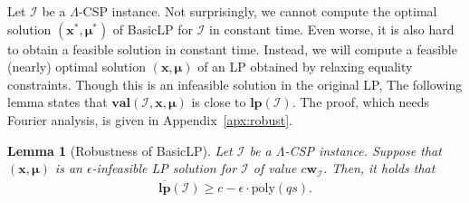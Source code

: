 \documentclass[letterpaper, 11pt]{article}
\newtheorem{lemma}[theorem]{Lemma}
\newcommand{\calI}{\mathcal{I}}
\newcommand{\biw}{\boldsymbol{w}}
\newcommand{\bix}{\boldsymbol{x}}
\newcommand{\bimu}{\boldsymbol{\mu}}
\newcommand{\blp}{\textsf{BasicLP}\xspace}
\newcommand{\lp}{\mathbf{lp}}
\newcommand{\val}{\mathbf{val}}
\newcommand{\ollp}{\overline{\mathbf{lp}}}
\newcommand{\poly}{\mathrm{poly}}
\begin{document}
Let $\calI$ be a $\Lambda$-CSP instance.
Not surprisingly,
we cannot compute the optimal solution $(\bix^*,\bimu^*)$ of \blp for $\calI$ in constant time.
Even worse, it is also hard to obtain a feasible solution in constant time.
Instead, we will compute a feasible (nearly) optimal solution $(\bix,\bimu)$ of an LP obtained by relaxing equality constraints.
Though this is an infeasible solution in the original LP,
The following lemma states that $\val(\calI,\bix,\bimu)$ is close to $\lp(\calI)$.
The proof, which needs Fourier analysis, is given in Appendix~\ref{apx:robust}.
\begin{lemma}[Robustness of \blp]\label{lmm:robust}
  Let $\calI$ be a $\Lambda$-CSP instance.
  Suppose that $(\bix,\bimu)$ is an $\epsilon$-infeasible LP solution for $\calI$ of value $c\biw_{\calI}$.
  Then, it holds that
  \begin{eqnarray*}
    \ollp(\calI)\geq c-\epsilon\cdot\poly(qs).
  \end{eqnarray*}
\end{lemma}
\end{document}

